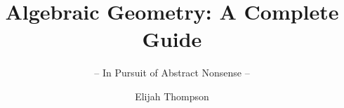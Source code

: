 \documentclass[graybox,envcountchap,sectrefs]{style/svmono}
\begin{document}
\author{Elijah Thompson}
\title{Algebraic Geometry: A Complete Guide}
\subtitle{-- In Pursuit of Abstract Nonsense --}
\maketitle

\frontmatter%

%
%

%

\tableofcontents

%


\mainmatter%














































\backmatter%
%
%
%
\printindex

\end{document}
